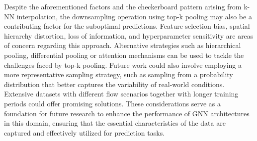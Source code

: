 Despite the aforementioned factors and the checkerboard pattern arising from k-NN interpolation, the downsampling operation using top-k pooling may also be a contributing factor for the suboptimal predictions. Feature selection bias, spatial hierarchy distortion, loss of information, and hyperparameter sensitivity are areas of concern regarding this approach. Alternative strategies such as hierarchical pooling, differential pooling or attention mechanisms can be used to tackle the challenges faced by top-k pooling. Future work could also involve employing a more representative sampling strategy, such as sampling from a probability distribution that better captures the variability of real-world conditions. Extensive datasets with different flow scenarios together with longer training periods could offer promising solutions. These considerations serve as a foundation for future research to enhance the performance of GNN architectures in this domain, ensuring that the essential characteristics of the data are captured and effectively utilized for prediction tasks.
